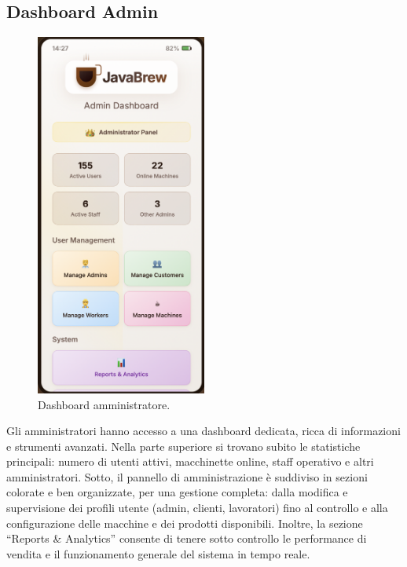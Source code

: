 \subsection{Dashboard Admin}
\begin{figure}[H]
    \centering
    \includegraphics[width=0.5\textwidth]{./assets/admin.png}
    \caption{Dashboard amministratore.}
\end{figure}
Gli amministratori hanno accesso a una dashboard dedicata, ricca di informazioni e strumenti avanzati. Nella parte superiore si trovano subito le statistiche principali: numero di utenti attivi, macchinette online, staff operativo e altri amministratori. Sotto, il pannello di amministrazione è suddiviso in sezioni colorate e ben organizzate, per una gestione completa: dalla modifica e supervisione dei profili utente (admin, clienti, lavoratori) fino al controllo e alla configurazione delle macchine e dei prodotti disponibili. Inoltre, la sezione “Reports \& Analytics” consente di tenere sotto controllo le performance di vendita e il funzionamento generale del sistema in tempo reale.

